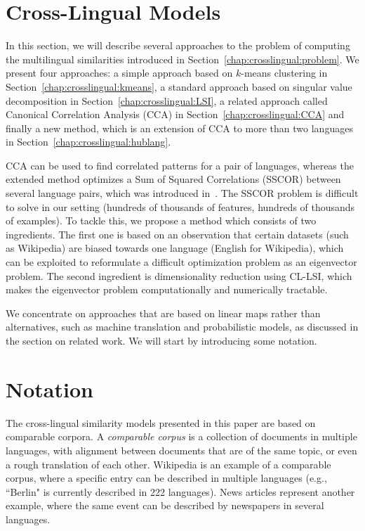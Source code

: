 \section{Cross-Lingual Models}\label{chap:crosslingual:models}
In this section, we will describe several approaches to the problem of computing the 
multilingual similarities introduced in Section~\ref{chap:crosslingual:problem}. We present four approaches:
a simple approach based on $k$-means clustering in Section~\ref{chap:crosslingual:kmeans}, a standard approach
based on singular value decomposition in Section~\ref{chap:crosslingual:LSI}, a related
approach called Canonical Correlation Analysis (CCA) in Section~\ref{chap:crosslingual:CCA} and finally a
new method, which is an extension of CCA to more than two languages in Section~\ref{chap:crosslingual:hublang}.

CCA can be used to find correlated patterns for a pair of languages, whereas the extended method 
optimizes a Sum of Squared Correlations (SSCOR) between several language pairs, which was introduced 
in~\cite{Kettenring}. The SSCOR problem is difficult to solve in our setting (hundreds of thousands 
of features, hundreds of thousands of examples). To tackle this, we propose a method which consists 
of two ingredients. The first one is based on an observation that certain datasets (such as Wikipedia) 
are biased towards one language (English for Wikipedia), which can be exploited to reformulate a 
difficult optimization problem as an eigenvector problem. The second ingredient is dimensionality 
reduction using CL-LSI, which makes the eigenvector problem computationally and numerically tractable.

We concentrate on approaches that are based on linear maps rather than alternatives, such as machine 
translation and probabilistic models, as discussed in the section on related work. We will start 
by introducing some notation.

\section{Notation}\label{chap:crosslingual:notation}

The cross-lingual similarity models presented in this paper are based on comparable corpora.
A \emph{comparable corpus} is a collection of documents in multiple languages, with alignment
between documents that are of the same topic, or even a rough translation of each other.
Wikipedia is an example of a comparable corpus, where a specific entry can be described in multiple
languages (e.g., ``Berlin" is currently described in 222 languages). News articles represent
another example, where the same event can be described by newspapers in several languages.

